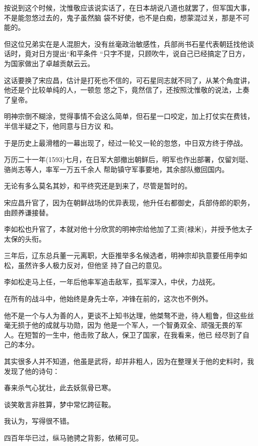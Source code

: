 \documentclass[11pt,a4paper,onecolumn]{article}
\begin{document}
按说到这个时候，沈惟敬应该说实话了，在日本胡说八道也就罢了，但军国大事，不是能忽悠过去的，鬼子虽然脑
袋不好使，也不是白痴，想蒙混过关，那是不可能的。

但这位兄弟实在是人混胆大，没有丝毫政治敏感性，兵部尚书石星代表朝廷找他谈话时，竟对日方提出``和平条件
``只字不提，只顾吹牛，说自己已经搞定了日方，为国家做出了卓越贡献云云。

这话要换了宋应昌，估计是打死也不信的，可石星同志就不同了，从某个角度讲，他还是个比较单纯的人，一顿忽
悠之下，竟然信了，还按照沈惟敬的说法，上奏了皇帝。

明神宗倒不糊涂，觉得事情不会这么简单，但石星一口咬定，加上打仗实在费钱，半信半疑之下，他同意与日方议
和。

于是历史上最滑稽的一幕出现了，经过一轮又一轮的忽悠，中日双方终于停战。

万历二十一年(1593)七月，在日军大部撤出朝鲜后，明军也作出部署，仅留刘珽、骆尚志等人，率军一万五千余人
帮助镇守军事要地，其余部队撤回国内。

无论有多么莫名其妙，和平终究还是到来了，尽管是暂时的。

宋应昌升官了，因为在朝鲜战场的优异表现，他升任右都御史，兵部侍郎的职务，由顾养谦接替。

李如松也升官了，本就对他十分欣赏的明神宗给他加了工资(禄米)，并授予他太子太保的头衔。

三年后，辽东总兵董一元离职，大臣推举多名候选者，明神宗却执意要任用李如松，虽然许多人极力反对，但他坚
持了自己的意见。

李如松走马上任，一年后他率军追击敌军，孤军深入，中伏，力战死。

在所有的战斗中，他始终是身先士卒，冲锋在前的，这次也不例外。

他不是一个与人为善的人，更谈不上知书达理，他桀骜不逊，待人粗鲁，但这些丝毫无损于他的成就与功勋，因为
他是一个军人，一个智勇双全、顽强无畏的军人。在短暂的一生中，他击败了敌人，保卫了国家，在我看来，他已
经尽到了自己的本分。

其实很多人并不知道，他虽是武将，却并非粗人，因为在整理关于他的史料时，我发现了他的诗句：

春来杀气心犹壮，此去妖氛骨已寒。

谈笑敢言非胜算，梦中常忆跨征鞍。

我认为，写得很不错。

四百年华已过，纵马驰骋之背影，依稀可见。

\section[\thesection]{}
\end{document}
